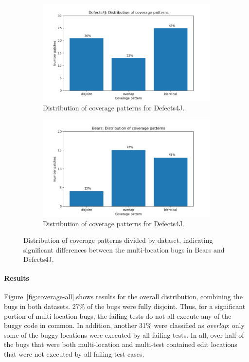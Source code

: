 \begin{figure}
	\begin{subfigure}{\linewidth}
		\includegraphics[width=\linewidth]{img/coverage-d4j.png}
		\caption{Distribution of coverage patterns for Defects4J.}
	\end{subfigure}
	\begin{subfigure}{\linewidth}
		\includegraphics[width=\linewidth]{img/coverage-bears.png}
		\caption{Distribution of coverage patterns for Defects4J.}
	\end{subfigure}
	\caption{Distribution of coverage patterns divided by dataset,
          indicating significant differences between the multi-location bugs in
          Bears and Defects4J.}
	\label{fig:coverage-datasets}
\end{figure}

\paragraph{Results}
Figure~\ref{fig:coverage-all} shows results for the overall distribution,
combining the bugs in both datasets. 27\%
of the bugs were fully disjoint.  Thus, for a significant portion of multi-location bugs,
the failing tests do not all execute any of the buggy code in common.  
In addition, another 31\% were classified as \emph{overlap}: only some of the
buggy locations were executed by all failing tests. In all, over half of 
the bugs that were both multi-location and multi-test contained edit locations that were 
not executed by all failing test cases.

